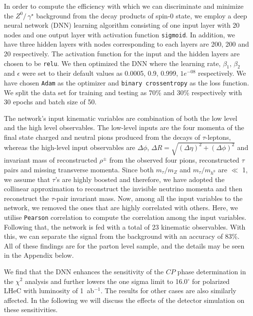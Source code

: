\documentclass[pdftex,twocolumn,epjc3]{svjour3}          %
\begin{document}
\par In order to compute the efficiency with which we can discriminate and minimize the $Z^0/\,\gamma^\star$ background from the decay products of spin-0 state, we employ a deep neural network (DNN) learning algorithm consisting  of one input layer with 20 nodes and one output layer with activation function \texttt{sigmoid}. In addition, we have three hidden layers with nodes corresponding to each layers are 200, 200 and 20 respectively. The activation function for the input and the hidden layers are chosen to be \texttt{relu}. We then optimized the DNN where  the learning rate, $\beta_1$, $\beta_2$ and $\epsilon$ were set to  their default values as 0.0005, 0.9, 0.999, $1e^{-08}$ respectively. We have chosen \texttt{Adam} as the optimizer and \texttt{binary crossentropy} as the loss function. We split the data set for training and testing as 70\% and 30\% respectively with 30 epochs and batch size of 50. 

\par The network's input kinematic variables  are combination of both the low level and the high level observables. 
The low-level inputs are the four momenta of the final state charged and  neutral pions produced from the decays of $\tau$-leptons, whereas the high-level input observables are $\Delta \phi$, $\Delta R=\sqrt{(\Delta \eta)^2 + (\Delta \phi)^2}$ and invariant mass of reconstructed $\rho^\pm$ from the observed four pions, reconstructed $\tau$ pairs and missing transverse momenta. Since both $m_\tau/ m_Z$ and $m_\tau/ m_{h^0}$ are $\ll$ 1, we assume that $\tau$'s are  highly boosted and therefore, we have adopted the collinear approximation to reconstruct the invisible neutrino momenta and then reconstruct the $\tau$-pair invariant mass. Now, among all the input variables to the network, we removed the ones that are highly correlated with others. Here, we utilise \texttt{Pearson} correlation to compute the correlation among the input variables.  Following that, the network is fed with a total of 23 kinematic observables. With this, we can separate the signal from the background with an accuracy of 83\%. All of these findings are for the parton level sample, and the details may be seen in the Appendix below.

\par We find that the DNN  enhances the sensitivity of  the $CP$ phase  determination in the $\chi^2$ analysis and further lowers the one sigma limit to 16.0$^\circ$ for polarized LHeC with luminosity of  1~ab$^{-1}$. The results for other cases are also similarly affected. In the following we will discuss the effects of the detector simulation on these sensitivities.
\end{document}
